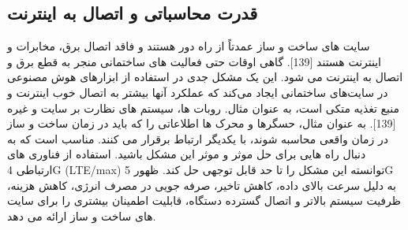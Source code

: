 \documentclass[towcolumn, 11pt]{Article}
\begin{document}
\begin{چکیده}
\subsection{قدرت محاسباتی و اتصال به اینترنت}
سایت های ساخت و ساز عمدتاً از راه دور هستند و فاقد اتصال برق، مخابرات و اینترنت هستند [139]. گاهی اوقات حتی فعالیت های ساختمانی منجر به قطع برق و اتصال به اینترنت می شود. این یک مشکل جدی در استفاده از ابزارهای هوش مصنوعی در سایت‌های ساختمانی ایجاد می‌کند که عملکرد آنها بیشتر به اتصال خوب اینترنت و منبع تغذیه متکی است، به عنوان مثال. روبات ها، سیستم های نظارت بر سایت و غیره [139]. به عنوان مثال، حسگرها و محرک ها اطلاعاتی را که باید در زمان ساخت و ساز در زمان واقعی محاسبه شوند، با یکدیگر ارتباط برقرار می کنند. مناسب است که به دنبال راه هایی برای حل موثر و موثر این مشکل باشید. استفاده از فناوری های ارتباطی 4G (LTE/max) توانسته این مشکل را تا حد قابل توجهی حل کند. ظهور 5G به دلیل سرعت بالای داده، کاهش تاخیر، صرفه جویی در مصرف انرژی، کاهش هزینه، ظرفیت سیستم بالاتر و اتصال گسترده دستگاه، قابلیت اطمینان بیشتری را برای سایت های ساخت و ساز ارائه می دهد.


\end{چکیده}
\end{document}
